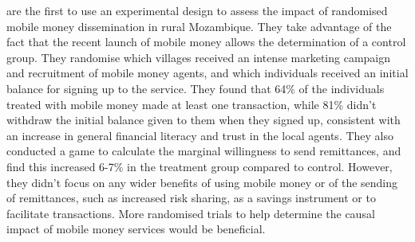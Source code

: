 \cite{Batista2013} are the first to use an experimental design to assess the impact of randomised mobile money dissemination in rural Mozambique. They take advantage of the fact that the recent launch of mobile money allows the determination of a  control group. They randomise which villages received an intense marketing campaign and recruitment of mobile money agents, and which individuals received an initial balance for signing up to the service. They found that 64\% of the individuals treated with mobile money made at least one transaction, while 81\% didn't withdraw the initial balance given to them when they signed up, consistent with an increase in general financial literacy and trust in the local agents. They also conducted a game to calculate the marginal willingness to send remittances, and find this increased 6-7\% in the treatment group compared to control. However, they didn't focus on any wider benefits of using mobile money or of the sending of remittances, such as increased risk sharing, as a savings instrument or to facilitate transactions. More randomised trials to help  determine the causal impact of mobile money services would be beneficial.  


